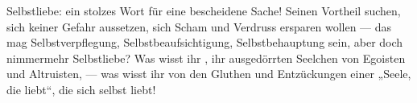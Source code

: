 Selbstliebe: ein stolzes Wort für eine bescheidene Sache! Seinen Vortheil suchen, sich keiner Gefahr aussetzen, sich Scham und Verdruss ersparen wollen — das mag Selbstverpflegung, Selbstbeaufsichtigung, Selbstbehauptung sein, aber doch nimmermehr Selbstliebe? Was wisst ihr , ihr ausgedörrten Seelchen von Egoisten und Altruisten, — was wisst ihr von den Gluthen und Entzückungen einer „Seele, die liebt“, die sich selbst liebt!
\par

